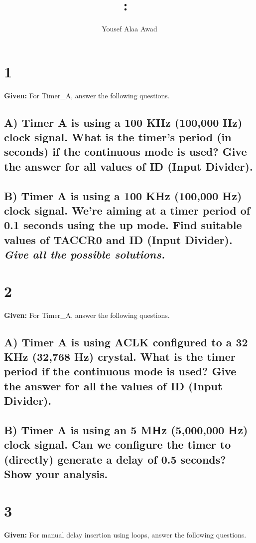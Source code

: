 \documentclass{article}
\title{
    \vspace{2in}
    \textmd{\textbf{\hmwkClass:\ \hmwkTitle}}\\
    \normalsize\vspace{0.1in}
    \vspace{3in}
}
\author{Yousef Alaa Awad}
\begin{document}
\maketitle
\pagebreak

\section{1}
\textbf{Given:} For Timer\_A, answer the following questions.

\subsection{A) Timer A is using a 100 KHz (100,000 Hz) clock signal. What is the timer’s period (in seconds) if the continuous mode is used? Give the answer for all values of ID (Input Divider).}



\subsection{B) Timer A is using a 100 KHz (100,000 Hz) clock signal. We’re aiming at a timer period of 0.1 seconds using the up mode. Find suitable values of TACCR0 and ID (Input Divider). \textit{Give all the possible solutions.}}

\section{2}
\textbf{Given:} For Timer\_A, answer the following questions.

\subsection{A) Timer A is using ACLK configured to a 32 KHz (32,768 Hz) crystal. What is the timer period if the continuous mode is used? Give the answer for all the values of ID (Input Divider).}

\subsection{B) Timer A is using an 5 MHz (5,000,000 Hz) clock signal. Can we configure the timer to (directly) generate a delay of 0.5 seconds? Show your analysis.}

\section{3}
\textbf{Given:} For manual delay insertion using loops, answer the following questions.
\end{document}
